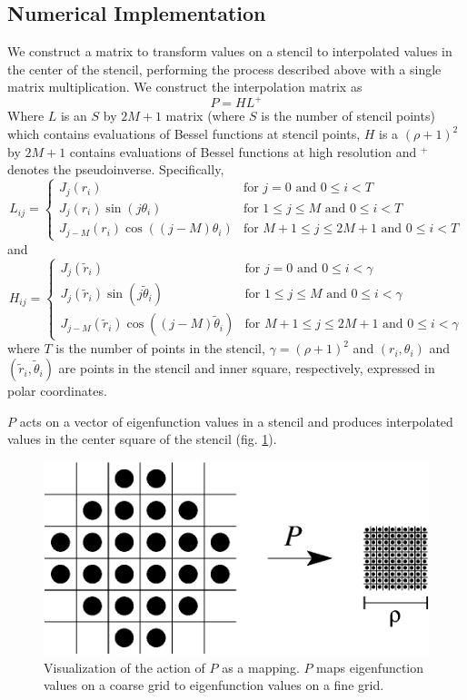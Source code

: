 \documentclass{report}
\begin{document}
\subsection{Numerical Implementation}
We construct a matrix to transform values on a stencil to interpolated values in the center of the stencil, performing the process described above with a single matrix multiplication. We construct the interpolation matrix as
\[
P = H L^{+}
\]
Where $L$ is an $S$ by $2M+1$ matrix (where $S$ is the number of stencil points) which contains evaluations of Bessel functions at stencil points, $H$ is a $(\rho + 1)^{2}$ by $2M+1$ contains evaluations of Bessel functions at high resolution and $^{+}$ denotes the pseudoinverse. Specifically,
\[
L_{ij} =\begin{cases}
J_{j}(r_{i}) & \text{for } j = 0 \text{ and } 0 \le i < T\\
J_{j}(r_{i}) \sin{(j \theta_{i})} & \text{for } 1 \le j \le M \text{ and } 0 \le i < T\\
J_{j-M}(r_{i}) \cos{((j-M) \theta_{i})} & \text{for } M+1 \le j \le 2M+1 \text{ and } 0 \le i < T
\end{cases}
\]
and
\[
H_{ij} =\begin{cases}
J_{j}(\tilde{r}_{i}) & \text{for } j = 0 \text{ and } 0 \le i < \gamma\\
J_{j}(\tilde{r}_{i}) \sin{(j \tilde{\theta}_{i})} & \text{for } 1 \le j \le M \text{ and } 0 \le i < \gamma\\
J_{j-M}(\tilde{r}_{i}) \cos{((j-M) \tilde{\theta}_{i})} & \text{for } M+1 \le j \le 2M+1 \text{ and } 0 \le i < \gamma
\end{cases}
\]
where $T$ is the number of points in the stencil, $\gamma = (\rho + 1)^{2}$ and $(r_{i},\theta_{i})$ and $(\tilde{r}_{i},\tilde{\theta}_{i})$ are points in the stencil and inner square, respectively, expressed in polar coordinates.

$P$ acts on a vector of eigenfunction values in a stencil and produces interpolated values in the center square of the stencil (fig. \ref{fig:upsample_action}).

\begin{figure}
  \begin{center}
    \includegraphics[width=\textwidth]{figs/stencils/upsample_action.eps}
    \caption{Visualization of the action of $P$ as a mapping. $P$ maps eigenfunction values on a coarse grid to eigenfunction values on a fine grid.}
    \label{fig:upsample_action}
  \end{center}
\end{figure}
\end{document}
